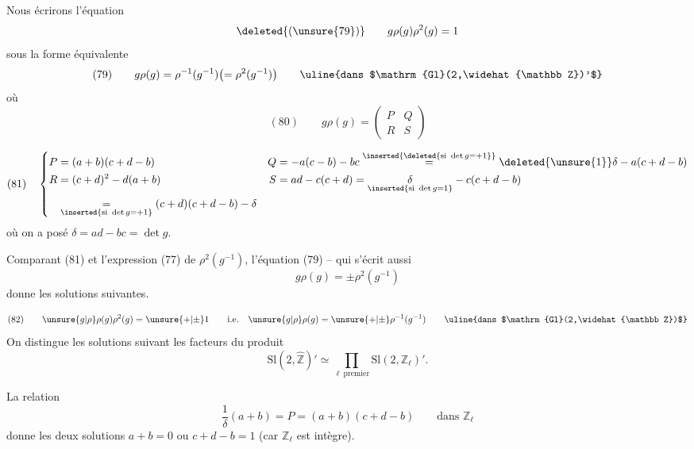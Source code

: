 Nous écrirons l'équation
\[
\deleted{(\unsure{79})}\qquad g\rho(g)\rho^2(g)=1
\]
sous la forme équivalente
\[
(79)\qquad g\rho(g)=\rho^{-1}(g^{-1})\bigl(=\rho^2(g^{-1})\bigr)
\qquad\text{\uline{dans $\mathrm{Gl}(2,\widehat{\mathbb Z})'$}}
\]
où
\[
(80)\qquad g\rho(g)=\begin{pmatrix}P&Q\\R&S\end{pmatrix}
\]


\[
(81)\quad
\left\{\begin{aligned}
P&=(a+b)(c+d-b)&Q&=-a(c-b)-bc\overset{\inserted{\deleted{\text{si }\det g=+1}}}{=}\deleted{\unsure{1}}\delta-a(c+d-b)\\
R&=(c+d)^2-d(a+b)&S&=ad-c(c+d)=\underset{\inserted{\text{si }\det g=1}}{\delta}-c(c+d-b)\\
&\underset{\inserted{\text{si }\det g=+1}}{=}(c+d)(c+d-b)-\delta
\end{aligned}\right.
\]
où on a posé $\delta=ad-bc=\det g$.

Comparant (81) et l'expression (77) de $\rho^2(g^{-1})$, l'équation (79) -- qui s'écrit aussi
\[
g\rho(g)=\pm\rho^2(g^{-1})
\]
donne les solutions suivantes.


\[
(82)\qquad \unsure{g|\rho}\rho(g)\rho^2(g)=\unsure{+|\pm}1\qquad\text{i.e.}\quad \unsure{g|\rho}\rho(g)=\unsure{+|\pm}\rho^{-1}(g^{-1})\qquad\text{\uline{dans $\mathrm{Gl}(2,\widehat{\mathbb Z})$}}
\]
On distingue les solutions suivant les facteurs du produit
\[
\mathrm{Sl}(2,\widehat{\mathbb Z})'\simeq\prod_{\ell\ \mathrm{premier}}\mathrm{Sl}(2,\mathbb Z_\ell)'.
\]

La relation
\[
\frac1\delta(a+b)=P=(a+b)(c+d-b)\qquad\text{dans }\mathbb Z_\ell
\]
donne les deux solutions $a+b=0$ ou $c+d-b=1$ (car $\mathbb Z_\ell$ est intègre).



